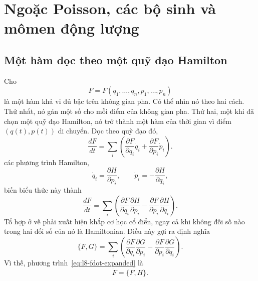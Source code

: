 \chapter{Ngoặc Poisson, các bộ sinh và mômen động lượng}


\section{Một hàm dọc theo một quỹ đạo Hamilton}

Cho
\[
  F=F(q_1,\ldots,q_n,p_1,\ldots,p_n)
\]
là một hàm khả vi đủ bậc trên không gian pha. Có thể nhìn nó theo hai cách. Thứ nhất, nó gán một số cho mỗi điểm của không gian pha. Thứ hai, một khi đã chọn một quỹ đạo Hamilton, nó trở thành một hàm của thời gian vì điểm \((q(t),p(t))\) di chuyển. Dọc theo quỹ đạo đó,
\begin{equation}
  \frac{dF}{dt}
  =
  \sum_i\left(
    \frac{\partial F}{\partial q_i}\dot q_i
    +\frac{\partial F}{\partial p_i}\dot p_i
  \right).
  \label{eq:l8-chain-rule}
\end{equation}
các phương trình Hamilton,
\begin{equation}
  \dot q_i=\frac{\partial H}{\partial p_i},
  \qquad
  \dot p_i=-\frac{\partial H}{\partial q_i},
  \label{eq:l8-hamilton-equations}
\end{equation}
biến biểu thức này thành
\begin{equation}
  \frac{dF}{dt}
  =
  \sum_i\left(
    \frac{\partial F}{\partial q_i}
    \frac{\partial H}{\partial p_i}
    -
    \frac{\partial F}{\partial p_i}
    \frac{\partial H}{\partial q_i}
  \right).
  \label{eq:l8-fdot-expanded}
\end{equation}
Tổ hợp ở vế phải xuất hiện khắp cơ học cổ điển, ngay cả khi không đối số nào trong hai đối số của nó là Hamiltonian. Điều này gợi ra định nghĩa
\begin{equation}
  \boxed{
  \{F,G\}
  =
  \sum_i\left(
    \frac{\partial F}{\partial q_i}
    \frac{\partial G}{\partial p_i}
    -
    \frac{\partial F}{\partial p_i}
    \frac{\partial G}{\partial q_i}
  \right).}
  \label{eq:l8-poisson-definition}
\end{equation}
Vì thế, phương trình~\eqref{eq:l8-fdot-expanded} là
\begin{equation}
  \boxed{\dot F=\{F,H\}.}
  \label{eq:l8-time-generator}
\end{equation}

